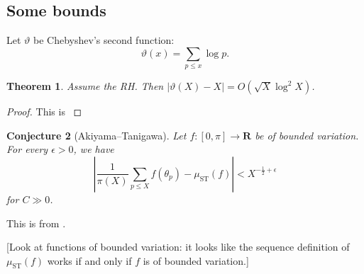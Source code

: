 \documentclass{article}
\DeclareMathOperator{\ST}{ST}
\newcommand{\bR}{\mathbf{R}}
\newtheorem{theorem}{Theorem}
\newtheorem{conjecture}[theorem]{Conjecture}
\numberwithin{theorem}{section}
\begin{document}
\subsection{Some bounds}

Let $\vartheta$ be Chebyshev's second function:
\[
	\vartheta(x) = \sum_{p\leqslant x} \log p .
\]

\begin{theorem}
Assume the RH. Then $|\vartheta(X)-X| = O(\sqrt X\log^2 X)$. 
\end{theorem}
\begin{proof}
This is \cite[Th.~10]{schoenfeld1976}
\end{proof}

\begin{conjecture}[Akiyama--Tanigawa]
Let $f\colon [0,\pi]\to \bR$ be of bounded variation. For every $\epsilon>0$, 
we have 
\[
	\left|\frac{1}{\pi(X)} \sum_{p\leqslant X} f(\theta_p) - \mu_{\mathrm{ST}}(f)\right| < X^{-\frac 1 2 + \epsilon}
\]
for $C\gg 0$. 
\end{conjecture}

This is from \cite{akiyama-tanigawa}.

[Look at functions of bounded variation: it looks like the sequence 
definition of $\mu_{\ST}(f)$ works if and only if $f$ is of bounded 
variation.]





\printbibliography
\end{document}
